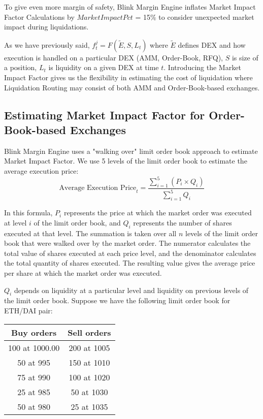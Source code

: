 \documentclass[letterpaper, 12pt]{article}
\begin{document}
To give even more margin of safety, Blink Margin Engine inflates Market Impact Factor Calculations by $MarketImpactPct$ = 15\% to consider unexpected market impact during liquidations. 

As we have previously said, $f_{t}^{j} = F(\widetilde{E}, S, L_{t})$ where $\widetilde{E}$ defines DEX and how execution is handled on a particular DEX (AMM, Order-Book, RFQ), $S$ is size of a position, $L_{t}$ is liquidity on a given DEX at time $t$. Introducing the Market Impact Factor gives us the flexibility in estimating the cost of liquidation where Liquidation Routing may consist of both AMM and Order-Book-based exchanges.


\subsection{Estimating Market Impact Factor for Order-Book-based Exchanges}
Blink Margin Engine uses a "walking over" limit order book approach to estimate Market Impact Factor. We use 5 levels of the limit order book to estimate the average execution price: $$ \text{Average Execution Price}_{t} = \frac{\sum\limits_{i=1}^{5} (P_i \times Q_i)}{\sum\limits_{i=1}^{5} Q_i} $$

In this formula, $P_i$ represents the price at which the market order was executed at level $i$ of the limit order book, and $Q_i$ represents the number of shares executed at that level. The summation is taken over all $n$ levels of the limit order book that were walked over by the market order. The numerator calculates the total value of shares executed at each price level, and the denominator calculates the total quantity of shares executed. The resulting value gives the average price per share at which the market order was executed.

$Q_i$ depends on liquidity at a particular level and liquidity on previous levels of the limit order book. Suppose we have the following limit order book for ETH/DAI pair:

\begin{table}[h]
\centering
\begin{tabular}{| c | c |}
\hline
 Buy orders & Sell orders \\
\hline
 100  at 1000.00 & 200  at 1005 \\
 50  at 995 & 150  at 1010 \\
 75  at 990 & 100  at 1020 \\
 25  at 985 & 50  at 1030 \\
 50  at 980 & 25  at 1035 \\
\hline
\end{tabular}
\end{table}
\end{document}

